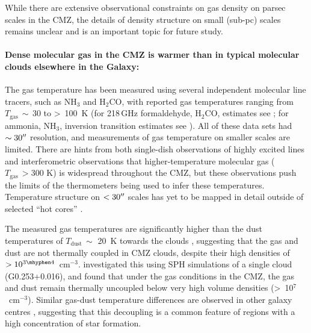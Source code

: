 While there are extensive observational constraints on gas density on parsec scales in the CMZ, the details of density structure on small (sub-pc) scales remains unclear and is an important topic for future study.

\paragraph{Dense molecular gas in the CMZ is warmer than in typical molecular clouds elsewhere in the Galaxy:}\label{subsubsec:tempstructure}
The gas temperature has been measured using several independent molecular line tracers, such as NH$_{3}$ and H$_{2}$CO, with reported gas temperatures ranging from $T_\mathrm{gas}\,\sim$\,30 to \textgreater \ 100~K (for 218\,GHz formaldehyde, H$_{2}$CO, estimates see \citealp{Ao2013, Ginsburg2016, Immer2016}; for ammonia, NH$_{3}$, inversion transition estimates see \citealp{Krieger2017}).
All of these data sets had $\sim30\mbox{$^{\prime\prime}$}$ resolution, and measurements of gas temperature on smaller scales are limited.
There are hints from both single-dish observations of highly excited lines \citep{Mills2013} and interferometric observations \citep{Johnston2014} that higher-temperature molecular gas ($T_\mathrm{gas}\,>300$ K) is widespread throughout the CMZ, but these observations push the limits of the thermometers being used to infer these temperatures.  Temperature structure on $<30\mbox{$^{\prime\prime}$}$ scales has yet to be mapped in detail outside of selected ``hot cores'' \citep[e.g.][]{Sanchez-Monge2017,Bonfand2017, Walker2018, Walker2021}.

The measured gas temperatures are significantly higher than the dust temperatures of $T_\mathrm{dust}\,\sim$ 20~K towards the clouds \citep[e.g.][]{Marsh2016,Tang2021a}, suggesting that the gas and dust are not thermally coupled in CMZ clouds, despite their high densities of $>10^{3\mhyphen4}$~cm$^{-3}$.
\citet{Clark2013} investigated this using SPH simulations of a single cloud (G0.253+0.016), and found that under the gas conditions in the CMZ, the gas and dust remain thermally uncoupled below very high volume densities (\textgreater \ 10$^{7}$~cm$^{-3}$).
Similar gas-dust temperature differences are observed in other galaxy centres \citep[e.g., M83, NGC 253,][see Table \ref{tab:properties_overview}]{Mangum2013}, suggesting that this decoupling is a common feature of regions with a high concentration of star formation.

